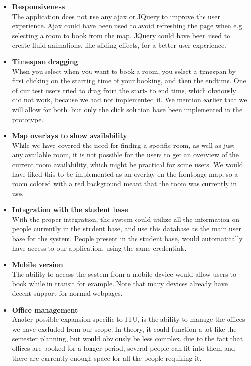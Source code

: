 \begin{itemize}
	\item \textbf{Responsiveness}\\
	The application does not use any ajax or JQuery to improve the user experience. Ajax could have been used to avoid refreshing the page when e.g. selecting a room to book from the map. JQuery could have been used to create fluid animations, like sliding effects, for a better user experience. 
	
	\item \textbf{Timespan dragging}\\
	When you select when you want to book a room, you select a timespan by first clicking on the starting time of your booking, and then the endtime. One of our test users tried to drag from the start- to end time, which obviously did not work, because we had not implemented it. We mention earlier that we will allow for both, but only the click solution have been implemented in the prototype.
	
	\item \textbf{Map overlays to show availability}\\
	While we have covered the need for finding a specific room, as well as just any available room, it is not possible for the users to get an overview of the current room availability, which might be practical for some users. We would have liked this to be implemented as an overlay on the frontpage map, so a room colored with a red background meant that the room was currently in use.
	
	\item \textbf{Integration with the student base}\\
	With the proper integration, the system could utilize all the information on people currently in the student base, and use this database as the main user base for the system. People present in the student base, would automatically have access to our application, using the same credentials. 
	
	\item \textbf{Mobile version}\\
	The ability to access the system from a mobile device would allow users to book while in transit for example. Note that many devices already have decent support for normal webpages.
	
	\item \textbf{Office management}\\
	Anoter possible expansion specific to ITU, is the ability to manage the offices we have excluded from our scope. In theory, it could function a lot like the semester planning, but would obviously be less complex, due to the fact that offices are booked for a longer period, several people can fit into them and there are currently enough space for all the people requiring it.
	

\end{itemize}
